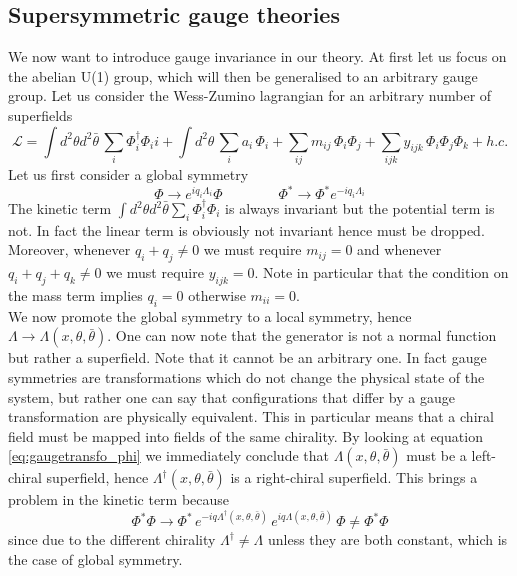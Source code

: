 \documentclass[12pt]{article}
\begin{document}
\subsection*{Supersymmetric gauge theories}
We now want to introduce gauge invariance in our theory. At first let us focus on the abelian U(1) group, which will then be generalised to an arbitrary gauge group. 
Let us consider the Wess-Zumino lagrangian for an arbitrary number of superfields
\begin{equation*}
  \mathcal{L} = \int d^2\theta d^2\bar\theta \, \sum_i \Phi_i^\dagger \Phi_ii + \int d^2\theta \, \sum_i a_i \, \Phi_i + \sum_{ij} m_{ij} \, \Phi_i\Phi_j + \sum_{ijk} y_{ijk} \, \Phi_i\Phi_j\Phi_k + h.c.
\end{equation*}
Let us first consider 
a global symmetry
\begin{equation}
  \Phi \to e^{iq_i \Lambda_i}\Phi \qquad \qquad \Phi^* \to \Phi^* e^{-iq_i \Lambda_i}
  \label{eq:gaugetransf_phi}
\end{equation}
The kinetic term $\int d^2\theta d^2\bar\theta \sum_i \Phi_i^\dagger \Phi_i$ is always invariant but the potential term is not. In fact the linear term is obviously not invariant hence must be dropped. 
Moreover, whenever $q_i + q_j \neq 0$ we must require $m_{ij} = 0$ and whenever $q_i + q_j + q_k \neq 0$ we must require $y_{ijk} = 0$. Note in particular that the condition on the mass term implies $q_i = 0$ otherwise $m_{ii} = 0$. \\
We now promote the global symmetry to a local symmetry, hence $\Lambda \to \Lambda(x, \theta, \bar\theta)$. One can now note that the generator is not a normal function but rather a superfield. Note that it cannot be an arbitrary one. 
In fact gauge symmetries are transformations which do not change the physical state of the system, but rather  one can say that configurations that differ by a gauge transformation are physically equivalent. This in particular means that a chiral field must be mapped into fields of the same chirality. 
By looking at equation \ref{eq:gaugetransfo_phi} we immediately conclude that $\Lambda(x, \theta, \bar\theta)$ must be a left-chiral superfield, hence $\Lambda^\dagger(x, \theta, \bar\theta)$ is a right-chiral superfield. This brings a problem in the kinetic term because 
\begin{equation*}
\Phi^* \Phi \to \Phi^* \, e^{-iq\Lambda^\dagger(x,\theta,\bar\theta)} \, e^{iq\Lambda(x,\theta,\bar\theta)} \, \Phi \neq \Phi^* \Phi
\end{equation*}
since due to the different chirality $\Lambda^\dagger \neq \Lambda $ unless they are both constant, which is the case of global symmetry. \\
\end{document}
